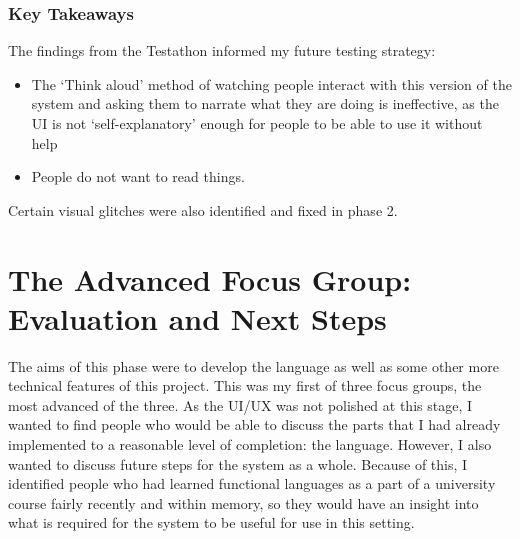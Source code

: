 

\subsubsection{Key Takeaways} The findings from the Testathon informed my future testing strategy:
\begin{itemize}
    \item The `Think aloud' method of watching people interact with this version of the system and asking them to narrate what they are doing is ineffective, as the UI is not `self-explanatory' enough for people to be able to use it without help 
    \item People do not want to read things. 
\end{itemize}

Certain visual glitches were also identified and fixed in phase 2. 

\section{The Advanced Focus Group: Evaluation and Next Steps}
\label{ref:afg_figma}
\label{ref:afg}
The aims of this phase were to develop the language as well as some other more technical features of this project. This was my first of three focus groups, the most advanced of the three. As the UI/UX was not polished at this stage, I wanted to find people who would be able to discuss the parts that I had already implemented to a reasonable level of completion: the language. However, I also wanted to discuss future steps for the system as a whole. Because of this, I identified people who had learned functional languages as a part of a university course fairly recently and within memory, so they would have an insight into what is required for the system to be useful for use in this setting. 

